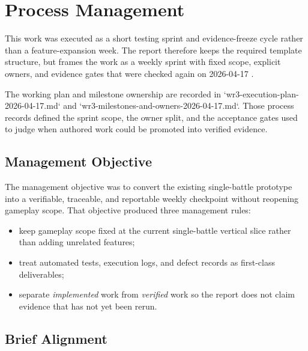 \chapter{Process Management}

This work was executed as a short testing sprint and evidence-freeze cycle rather than a feature-expansion week. The report therefore keeps the required template structure, but frames the work as a weekly sprint with fixed scope, explicit owners, and evidence gates that were checked again on 2026-04-17 \cite{courseSpecification,wr3Template,wr3SampleSummary}.

The working plan and milestone ownership are recorded in `wr3-execution-plan-2026-04-17.md` and `wr3-milestones-and-owners-2026-04-17.md`. Those process records defined the sprint scope, the owner split, and the acceptance gates used to judge when authored work could be promoted into verified evidence.

\section{Management Objective}

The management objective was to convert the existing single-battle prototype into a verifiable, traceable, and reportable weekly checkpoint without reopening gameplay scope. That objective produced three management rules:

\begin{itemize}
    \item keep gameplay scope fixed at the current single-battle vertical slice rather than adding unrelated features;
    \item treat automated tests, execution logs, and defect records as first-class deliverables;
    \item separate \textit{implemented} work from \textit{verified} work so the report does not claim evidence that has not yet been rerun.
\end{itemize}

\section{Brief Alignment}

